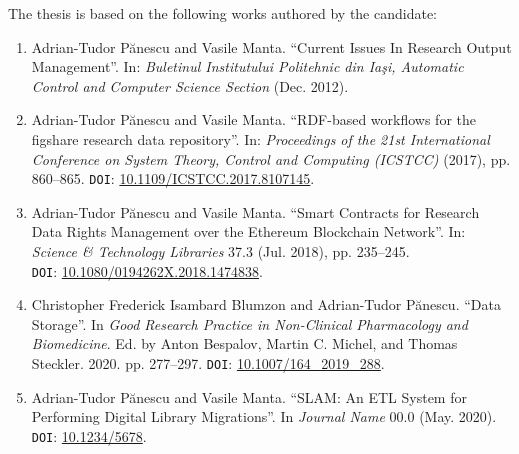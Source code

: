 The thesis is based on the following works authored by the candidate:

\begin{enumerate}

    \item Adrian-Tudor P\u{a}nescu and Vasile Manta. ``Current Issues In Research Output Management''. In: \emph{Buletinul Institutului Politehnic din Ia\c{s}i, Automatic Control and Computer Science Section} (Dec. 2012).
    
    \item Adrian-Tudor P\u{a}nescu and Vasile Manta. ``RDF-based workflows for the figshare research data repository''. In: \emph{Proceedings of the  21st International Conference on System Theory, Control and Computing (ICSTCC)} (2017), pp. 860--865. \texttt{DOI}: \href{https://doi.org/10.1109/ICSTCC.2017.8107145}{10.1109/ICSTCC.2017.8107145}.
    
    \item Adrian-Tudor P\u{a}nescu and Vasile Manta. ``Smart Contracts for Research Data Rights Management over the Ethereum Blockchain Network''. In: \emph{Science \& Technology Libraries} 37.3 (Jul. 2018), pp. 235--245.\\\texttt{DOI}: \href{https://doi.org/10.1080/0194262X.2018.1474838}{10.1080/0194262X.2018.1474838}.
    
    \item Christopher Frederick Isambard Blumzon and Adrian-Tudor P\u{a}nescu. ``Data Storage''. In \emph{Good Research Practice in Non-Clinical Pharmacology and\\Biomedicine}. Ed. by Anton Bespalov, Martin C. Michel, and Thomas Steckler. 2020. pp. 277--297. \texttt{DOI}: \href{https://doi.org/10.1007/164\_2019\_288}{10.1007/164\_2019\_288}.
    
    \item Adrian-Tudor P\u{a}nescu and Vasile Manta. ``SLAM: An ETL System for Performing Digital Library Migrations''. In \emph{Journal Name} 00.0 (May. 2020). \texttt{DOI}: \href{https://doi.org/10.1234/5678}{10.1234/5678}.
\end{enumerate}
